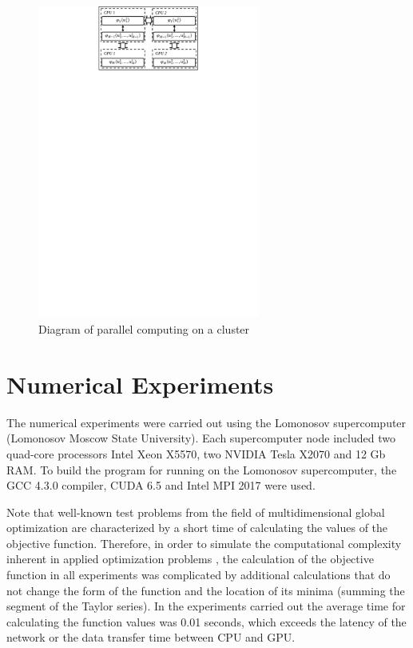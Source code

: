 \documentclass{svproc}
\begin{document}
   \begin{figure}[t]
    \centering
		\includegraphics[width=0.65\textwidth]{Parallel_Computing.pdf}
		\caption{Diagram of parallel computing on a cluster}\label{fig:Parallel_Computing}
\end{figure}

\section{Numerical Experiments}

The numerical experiments were carried out using the Lomonosov supercomputer (Lomonosov Moscow State University). Each supercomputer node included two quad-core processors Intel Xeon X5570, two NVIDIA Tesla X2070 and 12 Gb RAM. To build the program for running on the Lomonosov supercomputer, the GCC 4.3.0 compiler, CUDA 6.5 and Intel MPI 2017 were used.

Note that well-known test problems from the field of multidimensional global optimization are characterized by a short time of calculating the values of the objective function. Therefore, in order to simulate the computational complexity inherent in applied optimization problems \cite{Modorskii2016}, the calculation of the objective function in all experiments was complicated by additional calculations that do not change the form of the function and the location of its minima (summing the segment of the Taylor series). 
In the experiments carried out the average time for calculating the function values was 0.01 seconds, which exceeds the latency of the network or the data transfer time between CPU and GPU.
\end{document}
